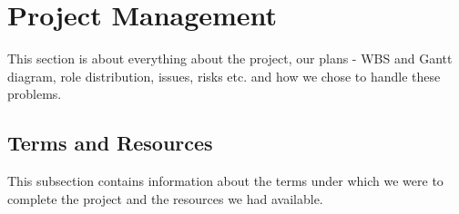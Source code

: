 \section{Project Management}
This section is about everything about the project, our plans - WBS and Gantt diagram, role distribution, issues, risks etc. and how we chose to handle these problems.%

\subsection{Terms and Resources}
This subsection contains information about the terms under which we were to complete the project and the resources we had available. %